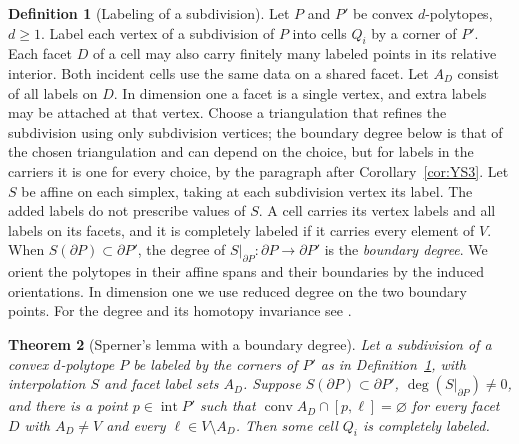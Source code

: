 \documentclass[11pt]{amsart}
\newtheorem{thm}{Theorem}[section]
\theoremstyle{definition}
\newtheorem{defn}[thm]{Definition}
\theoremstyle{remark}
\numberwithin{equation}{section}
\DeclareMathOperator{\conv}{conv}
\begin{document}
\begin{defn}[Labeling of a subdivision]\label{facetdata}
Let $P$ and $P'$ be convex $d$-polytopes, $d\ge1$. Label each vertex of a subdivision of $P$ into cells $Q_i$ by a corner of $P'$. Each facet $D$ of a cell may also carry finitely many labeled points in its relative interior. Both incident cells use the same data on a shared facet. Let $A_D$ consist of all labels on $D$. In dimension one a facet is a single vertex, and extra labels may be attached at that vertex. Choose a triangulation that refines the subdivision using only subdivision vertices; the boundary degree below is that of the chosen triangulation and can depend on the choice, but for labels in the carriers it is one for every choice, by the paragraph after Corollary~\ref{cor:YS3}. Let $S$ be affine on each simplex, taking at each subdivision vertex its label. The added labels do not prescribe values of $S$. A cell carries its vertex labels and all labels on its facets, and it is completely labeled if it carries every element of $V$. When $S(\partial P)\subset\partial P'$, the degree of $S|_{\partial P}\colon\partial P\to\partial P'$ is the \emph{boundary degree}. We orient the polytopes in their affine spans and their boundaries by the induced orientations. In dimension one we use reduced degree on the two boundary points. For the degree and its homotopy invariance see \cite[\S7.2]{BurnsG2005}.
\end{defn}

\begin{thm}[Sperner's lemma with a boundary degree]\label{thm:YS3}
Let a subdivision of a convex $d$-polytope $P$ be labeled by the corners of $P'$ as in Definition~\ref{facetdata}, with interpolation $S$ and facet label sets $A_D$. Suppose $S(\partial P)\subset\partial P'$, $\deg(S|_{\partial P})\ne0$, and there is a point $p\in\operatorname{int}P'$ such that $\conv A_D\cap[p,\ell]=\varnothing$ for every facet $D$ with $A_D\ne V$ and every $\ell\in V\setminus A_D$. Then some cell $Q_i$ is completely labeled.
\end{thm}
\end{document}
